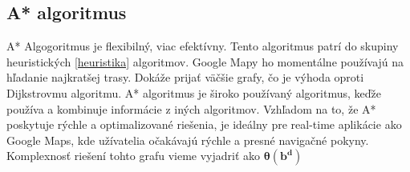\documentclass[10pt,slovak,a4paper]{article}
\begin{document}
\subsection{A* algoritmus}\label{Astar}
A* Algogoritmus je flexibilný, viac efektívny. Tento algoritmus patrí do skupiny heuristických \ref{heuristika} algoritmov.
Google Mapy ho momentálne používajú na hľadanie najkratšej trasy. Dokáže prijať väčšie grafy, čo je výhoda oproti Dijkstrovmu algoritmu. A* algoritmus je široko používaný algoritmus, keďže používa a kombinuje informácie z iných algoritmov. Vzhľadom na to, že A* poskytuje rýchle a optimalizované riešenia, je ideálny pre real-time aplikácie ako Google Maps, kde užívatelia očakávajú rýchle a presné navigačné pokyny. Komplexnosť riešení tohto grafu vieme vyjadriť ako $\boldsymbol{ \theta(b^d) }$
\paragraph{}
\end{document}

